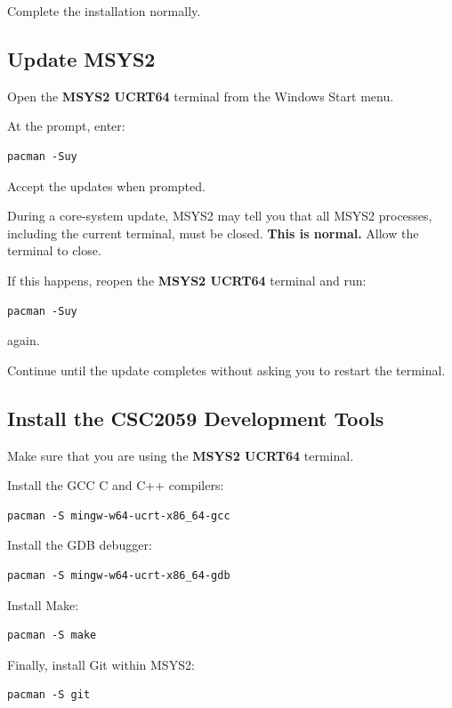 \documentclass{csc2059practical}
\begin{document}
Complete the installation normally.

\subsection{Update MSYS2}

Open the \textbf{MSYS2 UCRT64} terminal from the Windows Start menu.

At the prompt, enter:

\begin{verbatim}
pacman -Suy
\end{verbatim}

Accept the updates when prompted.

During a core-system update, MSYS2 may tell you that all MSYS2 processes, including the current terminal, must be closed. \textbf{This is normal.} Allow the terminal to close.

If this happens, reopen the \textbf{MSYS2 UCRT64} terminal and run:

\begin{verbatim}
pacman -Suy
\end{verbatim}

again.

Continue until the update completes without asking you to restart the terminal.

\subsection{Install the CSC2059 Development Tools}

Make sure that you are using the \textbf{MSYS2 UCRT64} terminal.

Install the GCC C and C++ compilers:

\begin{verbatim}
pacman -S mingw-w64-ucrt-x86_64-gcc
\end{verbatim}

Install the GDB debugger:

\begin{verbatim}
pacman -S mingw-w64-ucrt-x86_64-gdb
\end{verbatim}

Install Make:

\begin{verbatim}
pacman -S make
\end{verbatim}

Finally, install Git within MSYS2:

\begin{verbatim}
pacman -S git
\end{verbatim}
\end{document}
